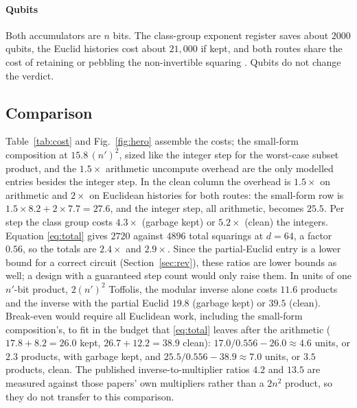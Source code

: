 \documentclass[runningheads]{llncs}
\begin{document}
\paragraph{Qubits} Both accumulators are $n$ bits. The class-group exponent register saves about $2000$ qubits, the Euclid histories cost about $21{,}000$ if kept, and both routes share the cost of retaining or pebbling the non-invertible squaring \cite{ragavan2024}. Qubits do not change the verdict.

\subsection{Comparison}
Table~\ref{tab:cost} and Fig.~\ref{fig:hero} assemble the costs; the small-form composition at $15.8\,(n')^2$, sized like the integer step for the worst-case subset product, and the $1.5\times$ arithmetic uncompute overhead are the only modelled entries besides the integer step. In the clean column the overhead is $1.5\times$ on arithmetic and $2\times$ on Euclidean histories for both routes: the small-form row is $1.5\times8.2+2\times7.7=27.6$, and the integer step, all arithmetic, becomes $25.5$. Per step the class group costs $4.3\times$ (garbage kept) or $5.2\times$ (clean) the integers. Equation \eqref{eq:total} gives $2720$ against $4896$ total squarings at $d=64$, a factor $0.56$, so the totals are $2.4\times$ and $2.9\times$. Since the partial-Euclid entry is a lower bound for a correct circuit (Section~\ref{sec:rev}), these ratios are lower bounds as well; a design with a guaranteed step count would only raise them. In units of one $n'$-bit product, $2(n')^2$ Toffolis, the modular inverse alone costs $11.6$ products and the inverse with the partial Euclid $19.8$ (garbage kept) or $39.5$ (clean). Break-even would require all Euclidean work, including the small-form composition's, to fit in the budget that \eqref{eq:total} leaves after the arithmetic ($17.8+8.2=26.0$ kept, $26.7+12.2=38.9$ clean): $17.0/0.556-26.0\approx4.6$ units, or $2.3$ products, with garbage kept, and $25.5/0.556-38.9\approx7.0$ units, or $3.5$ products, clean. The published inverse-to-multiplier ratios $4.2$ \cite{roetteler2017} and $13.5$ \cite{luo2026b} are measured against those papers' own multipliers rather than a $2n^2$ product, so they do not transfer to this comparison.

\begin{table}[t]
\caption{Toffoli cost of one sequential squaring step at $n=4096$, in units of $(n')^2$ with $n'=2048$, under the convention of Section~\ref{sec:rev}.}
\label{tab:cost}
\centering

\end{table}
\end{document}
